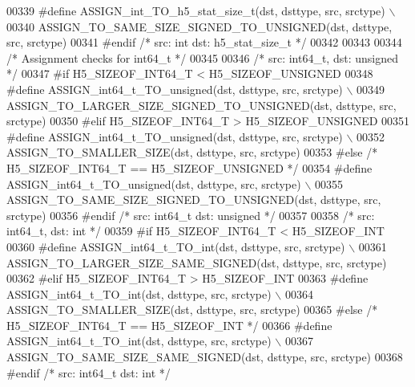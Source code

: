 \begin{DoxyCode}
00339 \textcolor{preprocessor}{    #define ASSIGN\_int\_TO\_h5\_stat\_size\_t(dst, dsttype, src, srctype) \(\backslash\)}
00340 \textcolor{preprocessor}{        ASSIGN\_TO\_SAME\_SIZE\_SIGNED\_TO\_UNSIGNED(dst, dsttype, src, srctype)}
00341 \textcolor{preprocessor}{#endif }\textcolor{comment}{/* src: int dst: h5\_stat\_size\_t */}\textcolor{preprocessor}{}
00342 
00343 
00344 \textcolor{comment}{/* Assignment checks for int64\_t */}
00345 
00346 \textcolor{comment}{/* src: int64\_t, dst: unsigned */}
00347 \textcolor{preprocessor}{#if H5\_SIZEOF\_INT64\_T < H5\_SIZEOF\_UNSIGNED}
00348 \textcolor{preprocessor}{    #define ASSIGN\_int64\_t\_TO\_unsigned(dst, dsttype, src, srctype) \(\backslash\)}
00349 \textcolor{preprocessor}{        ASSIGN\_TO\_LARGER\_SIZE\_SIGNED\_TO\_UNSIGNED(dst, dsttype, src, srctype)}
00350 \textcolor{preprocessor}{#elif H5\_SIZEOF\_INT64\_T > H5\_SIZEOF\_UNSIGNED}
00351 \textcolor{preprocessor}{    #define ASSIGN\_int64\_t\_TO\_unsigned(dst, dsttype, src, srctype) \(\backslash\)}
00352 \textcolor{preprocessor}{        ASSIGN\_TO\_SMALLER\_SIZE(dst, dsttype, src, srctype)}
00353 \textcolor{preprocessor}{#else }\textcolor{comment}{/* H5\_SIZEOF\_INT64\_T == H5\_SIZEOF\_UNSIGNED */}\textcolor{preprocessor}{}
00354 \textcolor{preprocessor}{    #define ASSIGN\_int64\_t\_TO\_unsigned(dst, dsttype, src, srctype) \(\backslash\)}
00355 \textcolor{preprocessor}{        ASSIGN\_TO\_SAME\_SIZE\_SIGNED\_TO\_UNSIGNED(dst, dsttype, src, srctype)}
00356 \textcolor{preprocessor}{#endif }\textcolor{comment}{/* src: int64\_t dst: unsigned */}\textcolor{preprocessor}{}
00357 
00358 \textcolor{comment}{/* src: int64\_t, dst: int */}
00359 \textcolor{preprocessor}{#if H5\_SIZEOF\_INT64\_T < H5\_SIZEOF\_INT}
00360 \textcolor{preprocessor}{    #define ASSIGN\_int64\_t\_TO\_int(dst, dsttype, src, srctype) \(\backslash\)}
00361 \textcolor{preprocessor}{        ASSIGN\_TO\_LARGER\_SIZE\_SAME\_SIGNED(dst, dsttype, src, srctype)}
00362 \textcolor{preprocessor}{#elif H5\_SIZEOF\_INT64\_T > H5\_SIZEOF\_INT}
00363 \textcolor{preprocessor}{    #define ASSIGN\_int64\_t\_TO\_int(dst, dsttype, src, srctype) \(\backslash\)}
00364 \textcolor{preprocessor}{        ASSIGN\_TO\_SMALLER\_SIZE(dst, dsttype, src, srctype)}
00365 \textcolor{preprocessor}{#else }\textcolor{comment}{/* H5\_SIZEOF\_INT64\_T == H5\_SIZEOF\_INT */}\textcolor{preprocessor}{}
00366 \textcolor{preprocessor}{    #define ASSIGN\_int64\_t\_TO\_int(dst, dsttype, src, srctype) \(\backslash\)}
00367 \textcolor{preprocessor}{        ASSIGN\_TO\_SAME\_SIZE\_SAME\_SIGNED(dst, dsttype, src, srctype)}
00368 \textcolor{preprocessor}{#endif }\textcolor{comment}{/* src: int64\_t dst: int */}\textcolor{preprocessor}{}

\end{DoxyCode}
